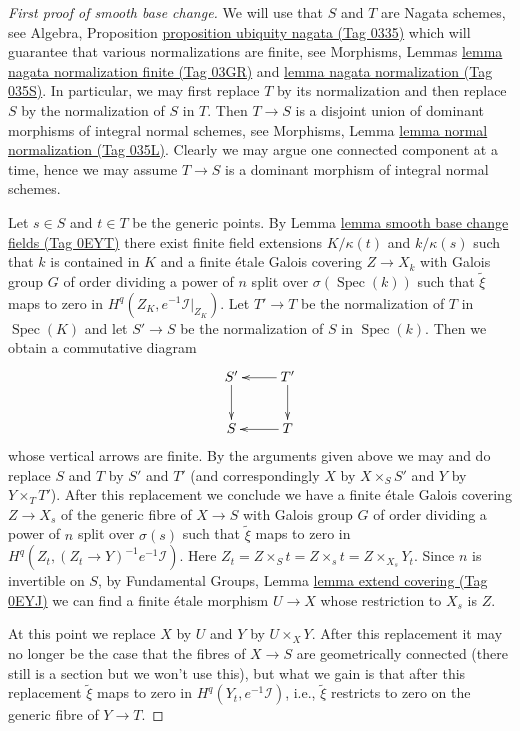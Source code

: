 \documentclass{amsart}
\theoremstyle{plain}
\theoremstyle{definition}
\theoremstyle{remark}
\numberwithin{equation}{subsection}
\def\Spec{\mathop{\mathrm{Spec}}}
\begin{document}
\begin{proof}[First proof of smooth base change]
\medskip\noindent
We will use that $S$ and $T$ are Nagata schemes, see
Algebra, Proposition \href{https://stacks.math.columbia.edu/tag/0335}{proposition ubiquity nagata (Tag 0335)}
which will guarantee
that various normalizations are finite, see
Morphisms, Lemmas \href{https://stacks.math.columbia.edu/tag/03GR}{lemma nagata normalization finite (Tag 03GR)} and
\href{https://stacks.math.columbia.edu/tag/035S}{lemma nagata normalization (Tag 035S)}.
In particular, we may first replace $T$ by its normalization
and then replace $S$ by the normalization of $S$ in $T$.
Then $T \to S$ is a disjoint union of dominant
morphisms of integral normal schemes, see
Morphisms, Lemma \href{https://stacks.math.columbia.edu/tag/035L}{lemma normal normalization (Tag 035L)}.
Clearly we may argue one connected component
at a time, hence we may assume $T \to S$ is a
dominant morphism of integral normal schemes.

\medskip\noindent
Let $s \in S$ and $t \in T$ be the generic points. By
Lemma \href{https://stacks.math.columbia.edu/tag/0EYT}{lemma smooth base change fields (Tag 0EYT)} there exist finite field
extensions $K/\kappa(t)$ and $k/\kappa(s)$ such that $k$ is contained in $K$
and a finite \'etale Galois covering $Z \to X_k$ with Galois group $G$
of order dividing a power of $n$ split over $\sigma(\Spec(k))$
such that $\tilde \xi$ maps to zero in $H^q(Z_K, e^{-1}\mathcal{I}|_{Z_K})$.
Let $T' \to T$ be the normalization of $T$ in $\Spec(K)$
and let $S' \to S$ be the normalization of $S$ in $\Spec(k)$.
Then we obtain a commutative diagram
$$
\xymatrix{
S' \ar[d] & T' \ar[l] \ar[d] \\
S & T \ar[l]
}
$$
whose vertical arrows are finite. By the arguments given above we
may and do replace $S$ and $T$ by $S'$ and $T'$ (and correspondingly
$X$ by $X \times_S S'$ and $Y$ by $Y \times_T T'$). After this replacement
we conclude we have a finite \'etale Galois covering
$Z \to X_s$ of the generic fibre of $X \to S$
with Galois group $G$ of order dividing a power of $n$
split over $\sigma(s)$ such that $\tilde \xi$ maps to zero in
$H^q(Z_t, (Z_t \to Y)^{-1}e^{-1}\mathcal{I})$.
Here $Z_t = Z \times_S t = Z \times_s t = Z \times_{X_s} Y_t$.
Since $n$ is invertible on $S$,
by Fundamental Groups, Lemma \href{https://stacks.math.columbia.edu/tag/0EYJ}{lemma extend covering (Tag 0EYJ)}
we can find a finite \'etale morphism $U \to X$ whose restriction to $X_s$
is $Z$.

\medskip\noindent
At this point we replace $X$ by $U$ and $Y$ by $U \times_X Y$.
After this replacement it may
no longer be the case that the fibres of $X \to S$ are geometrically
connected (there still is a section but we won't use this), but what
we gain is that after this replacement $\tilde \xi$ maps to zero
in $H^q(Y_t, e^{-1}\mathcal{I})$, i.e., $\tilde \xi$ restricts to
zero on the generic fibre of $Y \to T$.


\end{proof}
\end{document}
